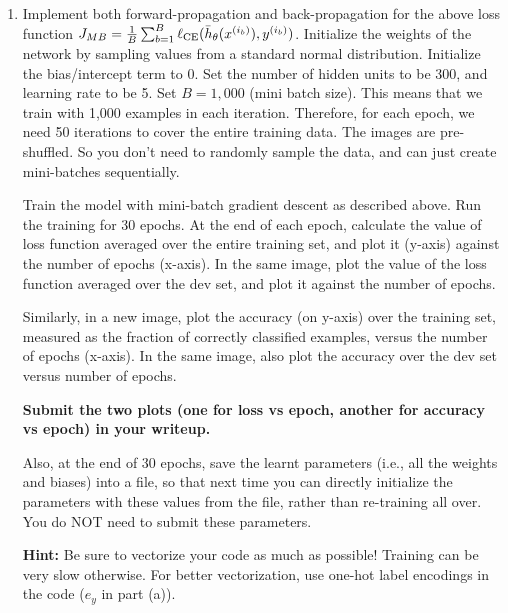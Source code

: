 \begin{enumerate}[label=\roman*.]
    \item {} 
    Implement both forward-propagation and back-propagation for the above loss function $J_{MB} = \frac{1}{B}\sum_{b=1}^B \ell_\textup{CE}(\bar{h}_{\theta}(x^{(i_b)}),y^{(i_b)})
    $. %
    Initialize the weights of the network by sampling values from a standard normal
    distribution. Initialize the bias/intercept term to 0.
    Set the number of hidden units to be 300, and learning rate to be 5. Set $B = 1,000$
    (mini batch size). This means that we train with 1,000 examples in each iteration.
    Therefore, for each epoch, we need 50 iterations to cover the entire training data.
    The images are pre-shuffled. So you don't need to randomly sample the data, and can
    just create mini-batches sequentially.
    
    
    Train the model with mini-batch gradient descent
    as described above. Run the training for 30 epochs. At the end of each epoch, calculate
    the value of loss function averaged over the entire training set, and plot it
    (y-axis) against the number of epochs (x-axis). In the same image, plot the value
    of the loss function averaged over the dev set, and plot it against the number of epochs.
    
    Similarly, in a new image, plot the accuracy (on y-axis) over the training set,
    measured as the fraction of correctly classified examples, versus the number of epochs
    (x-axis). In the same image, also plot the accuracy over the dev set versus number of epochs.
    
    \textbf{Submit the two plots (one for loss vs epoch, another for accuracy vs epoch) in your writeup.}
    
    Also, at the end of 30 epochs, save the learnt parameters (i.e., all the weights and biases)
    into a file, so that next time you can directly initialize the parameters with
    these values from the file, rather than re-training all over. You do NOT need to
    submit these parameters.

    \textbf{Hint:} Be sure to vectorize your code as much as possible! Training can be
very slow otherwise. For better vectorization, use one-hot label encodings in the code ($e_y$ in part (a)).

  \end{enumerate}
